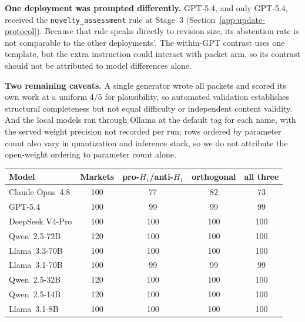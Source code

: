 \textbf{One deployment was prompted differently.} GPT-5.4, and only GPT-5.4,
received the \texttt{novelty\_assessment} rule at Stage~3
(Section~\ref{app:update-protocol}).  Because that rule speaks directly to revision
size, its abstention rate is not comparable to the other deployments'. The
within-GPT contrast uses one template, but the extra instruction could interact
with packet arm, so its contrast should not be attributed to model differences
alone.

\textbf{Two remaining caveats.} A single generator wrote all packets and scored its
own work at a uniform 4/5 for plausibility, so automated validation establishes
structural completeness but not equal difficulty or independent content validity.
And the local models ran through Ollama at the default tag for each name, with the
served weight precision not recorded per run; rows ordered by parameter count also
vary in quantization and inference stack, so we do not attribute the open-weight
ordering to parameter count alone.

\begin{center}
\begin{minipage}{\linewidth}
\centering
{}
\label{tab:exp1-arm-coverage}
\small
\begin{tabular}{lcccc}
\toprule
\textbf{Model} & \textbf{Markets} & \textbf{pro-$H_1$/anti-$H_1$} & \textbf{orthogonal} & \textbf{all three} \\
\midrule
Claude Opus~4.8 & 100 & 77 & 82 & 73 \\
GPT-5.4         & 100 & 99 & 99 & 99 \\
DeepSeek V4-Pro & 100 & 100 & 100 & 100 \\
\midrule
Qwen~2.5-72B    & 120 & 100 & 100 & 100 \\
Llama~3.3-70B   & 100 & 100 & 100 & 100 \\
Llama~3.1-70B   & 100 & 99 & 99 & 99 \\
Qwen~2.5-32B    & 120 & 100 & 100 & 100 \\
Qwen~2.5-14B    & 120 & 100 & 100 & 100 \\
Llama~3.1-8B    & 100 & 100 & 100 & 100 \\
\bottomrule
\end{tabular}
\end{minipage}
\end{center}


